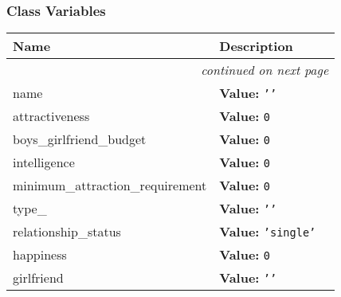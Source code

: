 
  \subsubsection{Class Variables}

    \vspace{-1cm}
\hspace{\varindent}\begin{longtable}{|p{\varnamewidth}|p{\vardescrwidth}|l}
\cline{1-2}
\cline{1-2} \centering \textbf{Name} & \centering \textbf{Description}& \\
\cline{1-2}
\endhead\cline{1-2}\multicolumn{3}{r}{\small\textit{continued on next page}}\\\endfoot\cline{1-2}
\endlastfoot\raggedright n\-a\-m\-e\- & \raggedright \textbf{Value:} 
{\tt \texttt{'}\texttt{}\texttt{'}}&\\
\cline{1-2}
\raggedright a\-t\-t\-r\-a\-c\-t\-i\-v\-e\-n\-e\-s\-s\- & \raggedright \textbf{Value:} 
{\tt 0}&\\
\cline{1-2}
\raggedright b\-o\-y\-s\-\_\-g\-i\-r\-l\-f\-r\-i\-e\-n\-d\-\_\-b\-u\-d\-g\-e\-t\- & \raggedright \textbf{Value:} 
{\tt 0}&\\
\cline{1-2}
\raggedright i\-n\-t\-e\-l\-l\-i\-g\-e\-n\-c\-e\- & \raggedright \textbf{Value:} 
{\tt 0}&\\
\cline{1-2}
\raggedright m\-i\-n\-i\-m\-u\-m\-\_\-a\-t\-t\-r\-a\-c\-t\-i\-o\-n\-\_\-r\-e\-q\-u\-i\-r\-e\-m\-e\-n\-t\- & \raggedright \textbf{Value:} 
{\tt 0}&\\
\cline{1-2}
\raggedright t\-y\-p\-e\-\_\- & \raggedright \textbf{Value:} 
{\tt \texttt{'}\texttt{}\texttt{'}}&\\
\cline{1-2}
\raggedright r\-e\-l\-a\-t\-i\-o\-n\-s\-h\-i\-p\-\_\-s\-t\-a\-t\-u\-s\- & \raggedright \textbf{Value:} 
{\tt \texttt{'}\texttt{single}\texttt{'}}&\\
\cline{1-2}
\raggedright h\-a\-p\-p\-i\-n\-e\-s\-s\- & \raggedright \textbf{Value:} 
{\tt 0}&\\
\cline{1-2}
\raggedright g\-i\-r\-l\-f\-r\-i\-e\-n\-d\- & \raggedright \textbf{Value:} 
{\tt \texttt{'}\texttt{}\texttt{'}}&\\
\cline{1-2}
\end{longtable}


